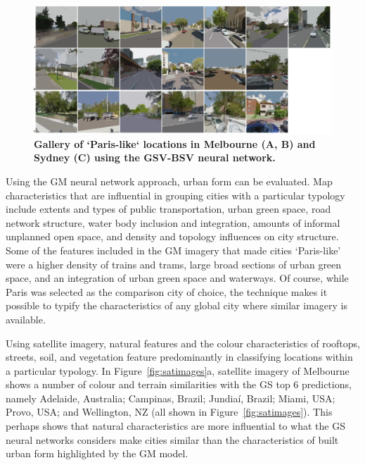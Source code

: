 \documentclass[Crown,sageh,times]{sagej}
\begin{document}
%
%


\begin{figure}[!htbp]
\centering    
\includegraphics[scale=0.20]{Images/Figure9MelSydStreet_2.png}  
\caption{\bf Gallery of `Paris-like` locations in Melbourne (A, B) and Sydney (C) using the GSV-BSV neural network.}    
 \label{fig:gsv_mel_gallery}  
\end{figure} 


Using the GM neural network approach, urban form can be evaluated. Map characteristics that are influential in grouping cities with a particular typology include extents and types of public transportation, urban green space, road network structure, water body inclusion and integration, amounts of informal unplanned open space, and density and topology influences on city structure. Some of the features included in the GM imagery that made cities `Paris-like' were a higher density of trains and trams, large broad sections of urban green space, and an integration of urban green space and waterways. Of course, while Paris was selected as the comparison city of choice, the technique makes it possible to typify the characteristics of any global city where similar imagery is available.

Using satellite imagery, natural features and the colour characteristics of rooftops, streets, soil, and vegetation feature predominantly in classifying locations within a particular typology. In Figure~\ref{fig:satimages}a, satellite imagery of Melbourne shows a number of colour and terrain similarities with the GS top 6 predictions, namely Adelaide, Australia; Campinas, Brazil; Jundia\'{i}, Brazil; Miami, USA; Provo, USA; and Wellington, NZ (all shown in Figure~\ref{fig:satimages}). This perhaps shows that natural characteristics are more influential to what the GS neural networks considers make cities similar than the characteristics of built urban form highlighted by the GM model.
\end{document}
